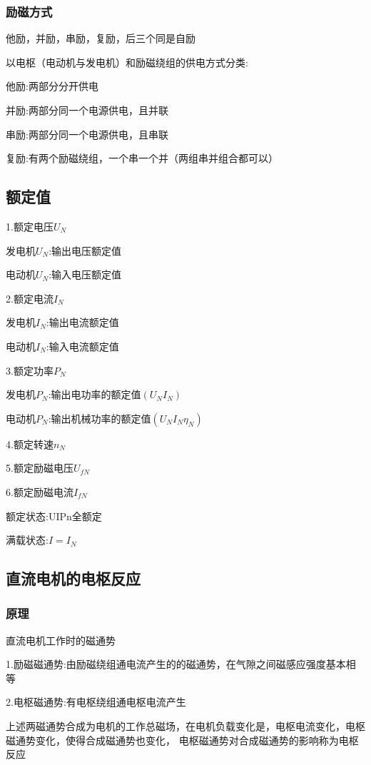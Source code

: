 \documentclass[11pt,twoside,a4paper]{ctexart}
\begin{document}
    \subsubsection{励磁方式}
    他励，并励，串励，复励，后三个同是自励

    以电枢（电动机与发电机）和励磁绕组的供电方式分类:

    他励:两部分分开供电

    并励:两部分同一个电源供电，且并联

    串励:两部分同一个电源供电，且串联

    复励:有两个励磁绕组，一个串一个并（两组串并组合都可以）

    \subsection{额定值}
    1.额定电压$U_N$
    
    发电机$U_N$:输出电压额定值

    电动机$U_N$:输入电压额定值

    2.额定电流$I_N$

    发电机$I_N$:输出电流额定值

    电动机$I_N$:输入电流额定值

    3.额定功率$P_N$

    发电机$P_N$:输出电功率的额定值$(U_NI_N)$

    电动机$P_N$:输出机械功率的额定值$(U_NI_N\eta _N)$

    4.额定转速$n_N$

    5.额定励磁电压$U_{fN}$

    6.额定励磁电流$I_{fN}$

    额定状态:UIPn全额定

    满载状态:$I = I_N$

    \subsection{直流电机的电枢反应}
    \subsubsection{原理}
    直流电机工作时的磁通势

    1.励磁磁通势:由励磁绕组通电流产生的的磁通势，在气隙之间磁感应强度基本相等

    2.电枢磁通势:有电枢绕组通电枢电流产生

    上述两磁通势合成为电机的工作总磁场，在电机负载变化是，电枢电流变化，电枢磁通势变化，使得合成磁通势也变化，
    电枢磁通势对合成磁通势的影响称为电枢反应
\end{document}
